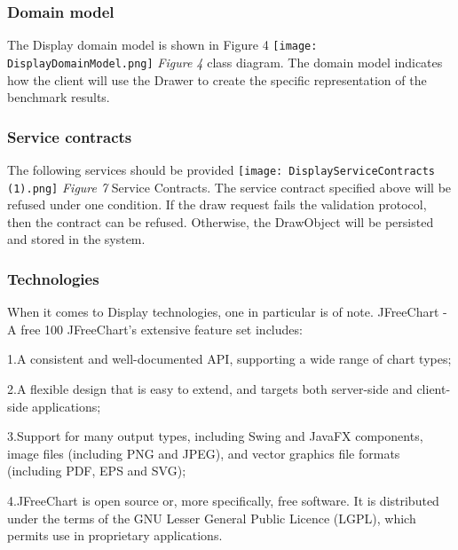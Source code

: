 \documentclass[runningheads,a4paper]{article}
\begin{document}
\subsubsection{\textbf{Domain model}}\newline
The Display domain model is shown in Figure 4
\newline
\newline
\texttt{[image: DisplayDomainModel.png]}
\newline 
\textit{Figure 4} class diagram.
\newline
The domain model indicates how the client will use the Drawer to create the specific representation of the benchmark results.
\newline
\subsubsection{\textbf{Service contracts}}\newline
The following services should be provided
\newline
\newline
\texttt{[image: DisplayServiceContracts (1).png]}
\newline 
\textit{Figure 7} Service Contracts.
\newline
The service contract specified above will be refused under one condition. If the draw request fails the validation protocol, 
then the contract can be refused. Otherwise, the DrawObject will be persisted and stored in the system.
\newline
\subsubsection{\textbf{Technologies}}
\newline
When it comes to Display technologies, one in particular is of note.
 JFreeChart - A free 100%
 JFreeChart's extensive feature set includes:
	\item 1.A consistent and well-documented API, supporting a wide range of chart types;
	\item 2.A flexible design that is easy to extend, and targets both server-side and client-side applications;
	\item 3.Support for many output types, including Swing and JavaFX components, image files (including PNG and JPEG), and vector graphics file formats (including PDF, EPS and SVG);
	\item 4.JFreeChart is open source or, more specifically, free software. It is distributed under the terms of the GNU Lesser General Public Licence (LGPL), which permits use in proprietary applications.\\
	
\end{document}
